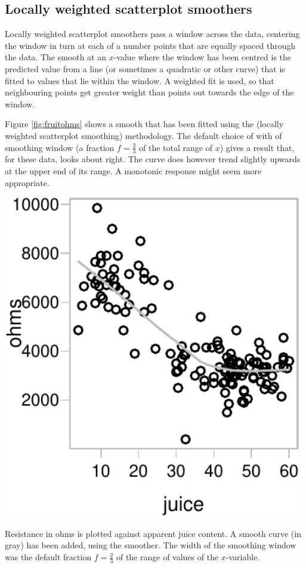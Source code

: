 \subsection{Locally weighted scatterplot smoothers}

Locally weighted scatterplot smoothers pass a window across
the data, centering the window in turn at each of a number points that
are equally spaced through the data. The smooth at an $x$-value where
the window has been centred is the predicted value from a line (or
sometimes a quadratic or other curve) that is fitted to values that
lie within the window. A weighted fit is used, so that neighbouring
points get greater weight than points out towards the edge of the
window.

Figure \ref{fig:fruitohms} shows a smooth that has been fitted using
the  (locally weighted scatterplot smoothing)
methodology.  The default choice of with of smoothing window (a fraction
$f = \frac{2}{3}$ of the total range of $x$) gives a result that,
for these data, looks about right. The curve does however trend
slightly upwards at the upper end of its range.  A monotonic
response might seem more appropriate.

\begin{marginfigure}
\begin{Schunk}


\centerline{\includegraphics[width=0.98\textwidth]{figs/8-smooth-ohms-1} }

\end{Schunk}
  \caption{Resistance in ohms is plotted against apparent juice
    content.  A smooth curve (in gray) has been added, using the
     smoother.  The width of the smoothing window was the
    default fraction $f = \frac{2}{3}$ of the range of values of the
    $x$-variable.}\label{fig:fruitohms}
\end{marginfigure}

